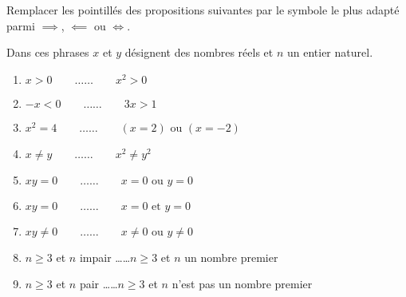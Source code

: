 \documentclass[11pt,class=report,crop=false]{standalone}
\begin{document}
\exercice{}
\enonce
Remplacer les pointillés des propositions suivantes par le symbole le plus adapté parmi $\implies$, $\impliedby$ ou $\iff$.

Dans ces phrases $x$ et $y$ désignent des nombres réels et $n$ un entier naturel.

\begin{enumerate}
    \item $x > 0  \qquad \ldots\ldots \qquad x^2 > 0$
    \item $ -x < 0 \qquad \ldots\ldots \qquad 3x > 1$    
    \item $x^2 = 4  \qquad \ldots\ldots \qquad (x = 2)  \text{ ou } (x = -2)$      
    \item $x \neq y  \qquad \ldots\ldots \qquad x^2 \neq y^2$
    \item $xy = 0  \qquad \ldots\ldots \qquad x = 0 \text{ ou } y = 0$    
    \item $xy = 0  \qquad \ldots\ldots \qquad x = 0 \text{ et } y = 0$
    \item $xy \neq 0  \qquad \ldots\ldots \qquad x \neq 0 \text{ ou } y \neq 0$  
    \item $n \ge 3$ et $n$ impair  \qquad \ldots\ldots \qquad $n \ge 3$ et $n$ un nombre premier 
    \item $n \ge 3$ et $n$ pair  \qquad \ldots\ldots \qquad $n \ge 3$ et $n$ n'est pas un nombre premier      
\end{enumerate} 
\finenonce

\noindication
\end{document}
